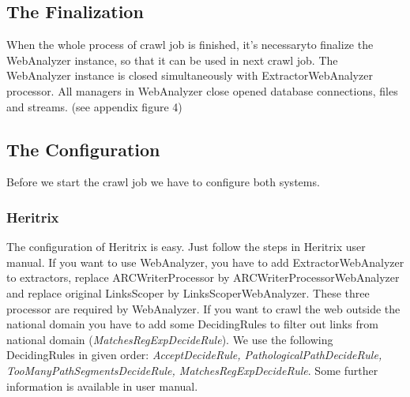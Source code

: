 \documentclass[11pt,a4paper]{article}
\begin{document}
\subsection{The Finalization}

When the whole process of crawl job is finished, it's necessaryto finalize the WebAnalyzer instance, so that it can be used in next crawl job. The WebAnalyzer instance is closed simultaneously with ExtractorWebAnalyzer processor. All managers in WebAnalyzer close opened database connections, files and streams. (see appendix figure 4)

\subsection{The Configuration}

Before we start the crawl job we have to configure both systems.

\subsubsection{Heritrix}
The configuration of Heritrix is easy. Just follow the steps in Heritrix user manual. If you want to use WebAnalyzer, you have to add ExtractorWebA\-na\-ly\-zer to extractors, replace ARCWriterProcessor by ARCWriterProcessorWebAnalyzer and replace original LinksScoper by LinksScoperWebAnalyzer. These three processor are required by WebAnalyzer. If you want to crawl the web outside the national domain you have to add some DecidingRules to filter out links from national domain (\emph{MatchesRegExpDecideRule}). We use the following DecidingRules in given order: \emph{AcceptDecideRule, Pa\-tho\-lo\-gi\-calPathDecideRule, TooManyPathSegmentsDecideRule, MatchesRegExpDecideRule}. Some further information is available in user manual.
\end{document}

